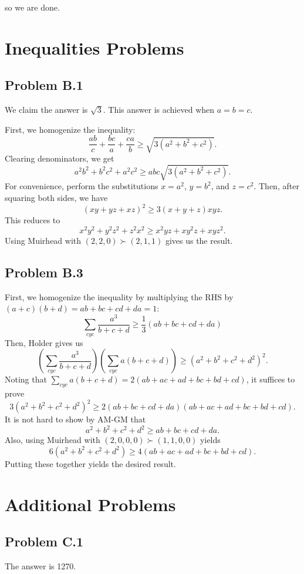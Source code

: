 \documentclass{scrartcl}
\begin{document}
so we are done.

\section*{Inequalities Problems}
\subsection*{Problem B.1}
We claim the answer is $\sqrt3$.
This answer is achieved when $a=b=c$.

First, we homogenize the inequality:
\[ \frac{ab}{c} + \frac{bc}{a} + \frac{ca}{b} \geq \sqrt{3(a^2+b^2+c^2)}. \]
Clearing denominators, we get
\[ a^2b^2 + b^2c^2 + a^2c^2 \geq abc\sqrt{3(a^2 + b^2 + c^2)}. \]
For convenience, perform the substitutions $x = a^2$, $y = b^2$, and $z = c^2$.
Then, after squaring both sides, we have
\[ (xy + yz + xz)^2 \geq 3(x+y+z)xyz. \]
This reduces to
\[ x^2y^2 + y^2z^2 + z^2x^2 \geq x^2yz + xy^2z + xyz^2. \]
Using Muirhead with $(2, 2, 0) \succ (2, 1, 1)$ gives us the result.

\subsection*{Problem B.3}
First, we homogenize the inequality by multiplying the RHS by $(a+c)(b+d) = ab + bc + cd + da = 1$:
\[ \sum_{cyc} \frac{a^3}{b+c+d} \geq \frac13 (ab + bc + cd + da)\]
Then, Holder gives us
\[ \left( \sum_{cyc} \frac{a^3}{b + c + d} \right)\left( \sum_{cyc} a(b+c+d) \right) \geq (a^2 + b^2 + c^2 + d^2)^2. \]
Noting that $\sum_{cyc} a(b + c + d) = 2(ab + ac + ad + bc + bd + cd)$, it suffices to prove
\[ 3(a^2 + b^2 + c^2 + d^2)^2 \geq 2(ab + bc + cd +da)(ab+ac+ad+bc+bd+cd). \]
It is not hard to show by AM-GM that
\[ a^2 + b^2 + c^2 + d^2 \geq ab + bc + cd + da. \]
Also, using Muirhead with $(2,0,0,0) \succ (1,1,0,0)$ yields
\[ 6(a^2 + b^2 + c^2 + d^2) \geq 4(ab + ac + ad + bc + bd + cd). \]
Putting these together yields the desired result.

\section*{Additional Problems}
\subsection*{Problem C.1}
The answer is 1270.
\end{document}

